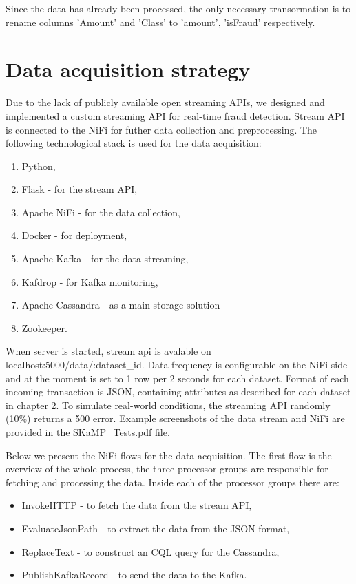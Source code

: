 \documentclass[12pt,a4paper, hidelinks]{article}
\begin{document}
Since the data has already been processed, the only necessary transormation is to rename columns 'Amount' and 'Class' to 'amount', 'isFraud' respectively.

\newpage

\section{Data acquisition strategy}

Due to the lack of publicly available open streaming APIs, we designed and implemented a custom streaming API for real-time fraud detection. Stream API is connected to the NiFi for futher data collection and preprocessing. The following technological stack is used for the data acquisition:

\begin{enumerate}
    \item Python,
    \item Flask  - for the stream API,
    \item Apache NiFi - for the data collection,
    \item Docker - for deployment,
    \item Apache Kafka - for the data streaming,
    \item Kafdrop - for Kafka monitoring,
    \item Apache Cassandra - as a main storage solution
    \item Zookeeper.
\end{enumerate}

When server is started, stream api is avalable on localhost:5000/data/:dataset\_id. Data frequency is configurable on the NiFi side and at the moment is set to 1 row per 2 seconds for each dataset. Format of each incoming transaction is JSON, containing attributes as described for each dataset in chapter 2. To simulate real-world conditions, the streaming API randomly (10\%) returns a 500 error. Example screenshots of the data stream and NiFi are provided in the SKaMP\_Tests.pdf file.

Below we present the NiFi flows for the data acquisition. The first flow is the overview of the whole process, the three processor groups are responsible for fetching and processing the data. Inside each of the processor groups there are:
\begin{itemize}
    \item InvokeHTTP - to fetch the data from the stream API,
    \item EvaluateJsonPath - to extract the data from the JSON format,
    \item ReplaceText - to construct an CQL query for the Cassandra,
    \item PublishKafkaRecord - to send the data to the Kafka.
\end{itemize}
\end{document}
